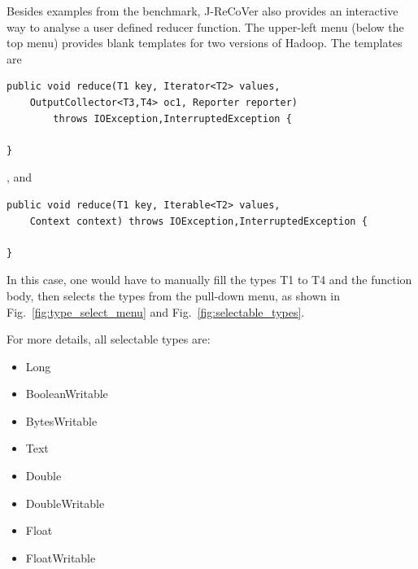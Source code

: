 Besides examples from the benchmark, J-ReCoVer also provides an interactive way to analyse a user defined reducer function.
The upper-left menu (below the top menu) provides blank templates for two versions of Hadoop. The templates are

\begin{mdframed}[roundcorner=5pt]
\begin{verbatim}
public void reduce(T1 key, Iterator<T2> values,
	OutputCollector<T3,T4> oc1, Reporter reporter)
		throws IOException,InterruptedException {

}
\end{verbatim}
\end{mdframed}

, and

\begin{mdframed}[roundcorner=5pt]
\begin{verbatim}
public void reduce(T1 key, Iterable<T2> values,
	Context context) throws IOException,InterruptedException {

}
\end{verbatim}
\end{mdframed}

In this case, one would have to manually fill the types T1 to T4 and the function body, then selects the types from the pull-down menu, as shown in Fig.~\ref{fig:type_select_menu} and Fig.~\ref{fig:selectable_types}.

For more details, all selectable types are:

\begin{itemize}
\item Long
\item BooleanWritable
\item BytesWritable
\item Text
\item Double
\item DoubleWritable
\item Float
\item FloatWritable
\end{itemize}
